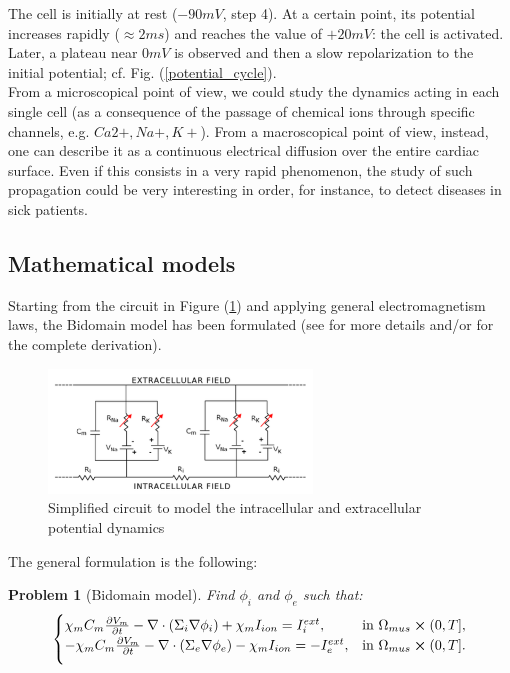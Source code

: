 \documentclass[a4paper,11pt]{article}
\newtheorem{problem}{Problem}
\begin{document}
    \noindent The cell is initially at rest ($-90mV$, step 4). At a certain point, its potential increases rapidly ($\approx2ms$) and reaches the value of $+20mV$: the cell is activated. Later, a plateau near $0mV$ is observed and then a slow repolarization to the initial potential; cf. Fig. (\ref{potential_cycle}). \\
    From a microscopical point of view, we could study the dynamics acting in each single cell (as a consequence of the passage of chemical ions through specific channels, e.g. $Ca2+,Na+,K+$). From a macroscopical point of view, instead, one can describe it as a continuous electrical diffusion over the entire cardiac surface. Even if this consists in a very rapid phenomenon, the study of such propagation could be very interesting in order, for instance, to detect diseases in sick patients.
    
    \subsection{Mathematical models}
    Starting from the circuit in Figure (\ref{electrical_circuit}) and applying general electromagnetism laws, the Bidomain model has been formulated (see \parencite{acta} for more details and/or \parencite{colli_franzone} for the complete derivation).
    
    \begin{figure}[h]
    	\begin{center}
    		\includegraphics[width = 7cm]{./electrical_circuit.png}
    		\caption{Simplified circuit to model the intracellular and extracellular potential dynamics}
    		\label{electrical_circuit}
    	\end{center}
    \end{figure}
    
    \noindent The general formulation is the following: \vspace{3mm}
    \begin{problem}[Bidomain model]
    Find $\phi_i$ and $\phi_e$ such that:
	\begin{equation*}
	\begin{cases}
	\chi_m C_m\pdv{V_m}{t} - \nabla \cdot (\Sigma_i \nabla \phi_i) + \chi_m I_{ion} = I_i^{ext},    & \text{in } \Omega_{mus} \cross (0,T],
	\\
	\vspace{2mm}
	-\chi_m C_m\pdv{V_m}{t} - \nabla \cdot (\Sigma_e \nabla \phi_e) - \chi_m I_{ion} = -I_e^{ext},    & \text{in } \Omega_{mus} \cross (0,T].
	\end{cases}
	\end{equation*}
	\end{problem}
	\vspace{3mm}
	
\end{document}
